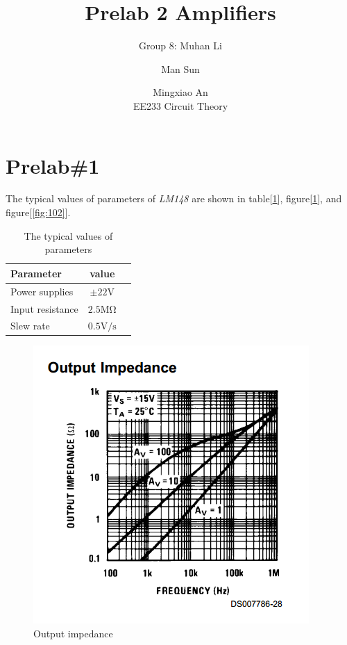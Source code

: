 \documentclass{IEEEtran}
\title{Prelab 2 Amplifiers}
\author{Group 8: Muhan Li \and Man Sun \and Mingxiao An \\ EE233 Circuit Theory}
\begin{document}
	\maketitle
	\section{\textbf{Prelab\#1}}
	The typical values of parameters of \textit{LM148} are shown in table[\ref{tab:pl1}], figure[\ref{fig:101}], and figure[\ref{fig:102}].
	\begin{table}[!htbp]
		\centering
		\caption{The typical values of parameters}
		\begin{tabular}{lcl}
			\toprule
			Parameter & value & \\
			\midrule
			Power supplies & $\pm22\mathrm{V}$ & \\
			Input resistance & $2.5\mathrm{M\Omega}$ & \\
			Slew rate & $0.5\mathrm{V}/\mathrm{s}$& \\
			\bottomrule
		\end{tabular}
		\label{tab:pl1}
	\end{table}
	\begin{figure}[!htbp]
		\centering
		\begin{framed}
			\includegraphics[width=\linewidth]{images/1_1.PNG}
			\caption{Output impedance}
		\end{framed}
		\label{fig:101}
	\end{figure}
\end{document}
